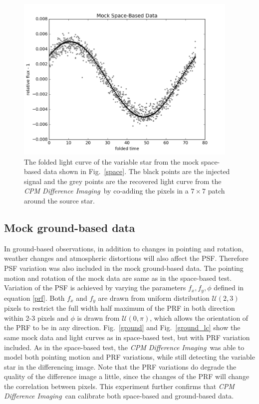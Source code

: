 \documentclass[12pt, preprint]{aastex}
\newcommand{\project}[1]{\textsl{#1}}
\newcommand{\cpmdiff}{\project{CPM Difference Imaging}}
\begin{document}
\begin{figure}[p]
\begin{center}
\includegraphics[width=0.95\textwidth]{f2a}
\end{center}
\caption{
\label{space_lc}
 The folded light curve of the variable star from the mock space-based data shown in Fig.~\ref{space}.
 The black points are the injected signal and the grey points are the recovered light curve from the \cpmdiff\ by co-adding the pixels in a $7\times 7$ patch around the source star.
}
\end{figure}

\subsection{Mock ground-based data}
In ground-based observations, in addition to changes in pointing and rotation, weather changes and atmospheric distortions will also affect the PSF. 
Therefore PSF variation was also included in the mock ground-based data. 
The pointing motion and rotation of the mock data are same as in the space-based test.
Variation of the PSF is achieved by varying the parameters $f_x, f_y, \phi$ defined in equation \ref{prf}.
Both $f_x$ and $f_y$ are drawn from uniform distribution ${\mathcal {U}}(2,3)$ pixels to restrict the full width half maximum of the PRF in both direction within 2-3 pixels and $\phi$ is drawn from ${\mathcal {U}}(0,\pi)$, which allows the orientation of the PRF to be in any direction.
Fig.~\ref{ground} and Fig.~\ref{ground_lc} show the same mock data and light curves as in space-based test, but with PRF variation included.  
As in the space-based test, the \cpmdiff\ was able to model both pointing motion and PRF variations, while still detecting the variable star in the differencing image.
Note that the PRF variations do degrade the quality of the difference image a little, since the changes of the PRF will change the correlation between pixels.
This experiment further confirms that \cpmdiff\ can calibrate both space-based and ground-based data.
\end{document}
